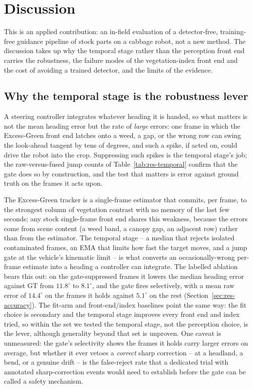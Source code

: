
\section{Discussion}
\label{sec:discussion}

This is an applied contribution: an in-field evaluation of a detector-free, training-free guidance pipeline
of stock parts on a cabbage robot, not a new method. The discussion takes up why the temporal stage rather
than the perception front end carries the robustness, the failure modes of the vegetation-index front end
and the cost of avoiding a trained detector, and the limits of the evidence.

\subsection{Why the temporal stage is the robustness lever}
\label{sec:disc-safety}
A steering controller integrates whatever heading it is handed, so what matters is not the mean heading
error but the rate of \emph{large} errors: one frame in which the Excess-Green front end latches onto a
weed, a gap, or the wrong row can swing the look-ahead tangent by tens of degrees, and such a spike, if
acted on, could drive the robot into the crop. Suppressing such spikes is the temporal stage's job; the
raw-versus-fused jump counts of Table~\ref{tab:res-temporal} confirm that the gate does so by construction,
and the test that matters is error against ground truth on the frames it acts upon.

The Excess-Green tracker is a single-frame estimator that commits, per frame, to the strongest column of
vegetation contrast with no memory of the last few seconds; any stock single-frame front end shares this
weakness, because the errors come from scene content (a weed band, a canopy gap, an adjacent row) rather
than from the estimator. The temporal stage -- a median that rejects isolated contaminated frames, an EMA
that limits how fast the target moves, and a jump gate at the vehicle's kinematic limit -- is what converts
an occasionally-wrong per-frame estimate into a heading a controller can integrate. The labelled ablation
bears this out: on the gate-suppressed frames it lowers the median heading error against GT from
$11.8^{\circ}$ to $8.1^{\circ}$, and the gate fires selectively, with a mean raw error of $14.4^{\circ}$ on
the frames it holds against $5.1^{\circ}$ on the rest (Section~\ref{sec:res-accuracy}). The fit-arm and
front-end/index baselines point the same way: the fit choice is secondary and the temporal stage improves
every front end and index tried, so within the set we tested the temporal stage, not the perception choice,
is the lever, although generality beyond that set is unproven. One caveat is unmeasured: the gate's
selectivity shows the frames it holds carry larger errors on average, but whether it ever vetoes a
\emph{correct} sharp correction -- at a headland, a bend, or a genuine drift -- is the false-reject rate
that a dedicated trial with annotated sharp-correction events would need to establish before the gate can be
called a safety mechanism.

